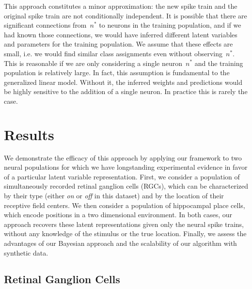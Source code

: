 This approach constitutes a minor approximation:
the new spike train and the original spike train are not
conditionally independent. It is possible that there are
significant connections from~$n^*$ to neurons in the training
population, and if we had known those connections, we would
have inferred different latent variables and parameters for
the training population. We assume that these effects are small,
i.e. we would find similar class assignments even without observing~$n^*$.
This is reasonable if we are only considering a single neuron~$n^*$
and the training population is relatively large.
In fact, this assumption is fundamental to the generalized
linear model. Without it, the inferred weights and predictions
would be highly sensitive to the addition of a single neuron.
In practice this is rarely the case.


\section{Results}
We demonstrate the efficacy of this approach by applying our framework 
to two neural populations for which we have longstanding experimental 
evidence in favor of a particular latent variable representation.
First, we consider a population of simultaneously recorded retinal 
ganglion cells (RGCs), which can be characterized by their type 
(either \textit{on} or \textit{off} in this dataset) and
by the location of their receptive field centers. 
We then consider a population of hippocampal place cells, which encode 
positions in a two dimensional environment. In both cases, our approach 
recovers these latent representations given only the neural spike trains,
without any knowledge of the stimulus or the true location. Finally, 
we assess the advantages of our Bayesian approach and the scalability 
of our algorithm with synthetic data.

\subsection{Retinal Ganglion Cells}
\label{sec:rgc}

